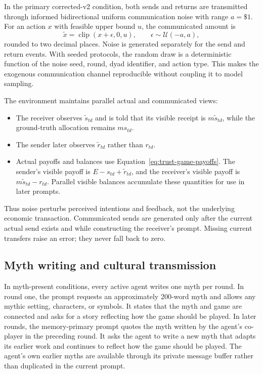 In the primary corrected-v2 condition, both sends and returns are transmitted
through informed bidirectional uniform communication noise with range $a=\$1$.
For an action $x$ with feasible upper bound $u$, the communicated amount is
\begin{equation}
    \widetilde{x}
    = \operatorname{clip}\!\left(x+\epsilon,0,u\right),
    \qquad
    \epsilon\sim\mathcal{U}(-a,a),
    \label{eq:communication-noise}
\end{equation}
rounded to two decimal places. Noise is generated separately for the send and
return events. With seeded protocols, the random draw is a deterministic
function of the noise seed, round, dyad identifier, and action type. This makes
the exogenous communication channel reproducible without coupling it to model
sampling.

The environment maintains parallel actual and communicated views:
\begin{itemize}
    \item The receiver observes $\widetilde{s}_{td}$ and is told that its
    visible receipt is $m\widetilde{s}_{td}$, while the ground-truth allocation
    remains $m s_{td}$.
    \item The sender later observes $\widetilde{r}_{td}$ rather than
    $r_{td}$.
    \item Actual payoffs and balances use Equation~\ref{eq:trust-game-payoffs}.
    The sender's visible payoff is $E-s_{td}+\widetilde{r}_{td}$, and the
    receiver's visible payoff is $m\widetilde{s}_{td}-r_{td}$. Parallel visible
    balances accumulate these quantities for use in later prompts.
\end{itemize}
Thus noise perturbs perceived intentions and feedback, not the underlying
economic transaction. Communicated sends are generated only after the current
actual send exists and while constructing the receiver's prompt. Missing
current transfers raise an error; they never fall back to zero.

\subsection{Myth writing and cultural transmission}
\label{sec:protocol-myths}

In myth-present conditions, every active agent writes one myth per round. In
round one, the prompt requests an approximately 200-word myth and allows any
mythic setting, characters, or symbols. It states that the myth and game are
connected and asks for a story reflecting how the game should be played. In
later rounds, the memory-primary prompt quotes the myth written by the agent's
co-player in the preceding round. It asks the agent to write a new myth that
adapts its earlier work and continues to reflect how the game should be played.
The agent's own earlier myths are available through its private message buffer
rather than duplicated in the current prompt.


